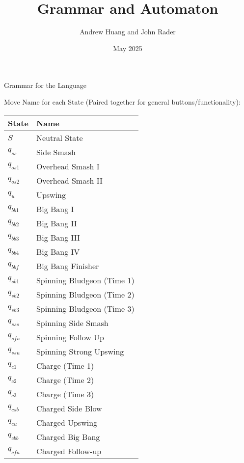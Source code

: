 \documentclass{article}
\title{Grammar and Automaton}
\author{Andrew Huang and John Rader}
\date{May 2025}
\begin{document}
\maketitle


\begin{mylist}

\item Grammar for the Language

Move Name for each State (Paired together for general buttons/functionality): \\
\begin{table}[h] 
  \begin{tabular}{l | l}
    State & Name  \\
    \hline
    $S$ & Neutral State \\
    $q_{ss}$ & Side Smash \\
    $q_{os1}$ & Overhead Smash I \\
    $q_{os2}$ & Overhead Smash II \\
    $q_{u}$ & Upswing \\
    $q_{bb1}$ & Big Bang I \\
    $q_{bb2}$ & Big Bang II \\
    $q_{bb3}$ & Big Bang III \\
    $q_{bb4}$ & Big Bang IV \\
    $q_{bbf}$ & Big Bang Finisher\\
    $q_{sb1}$ & Spinning Bludgeon (Time 1)\\
    $q_{sb2}$ & Spinning Bludgeon (Time 2)\\
    $q_{sb3}$ & Spinning Bludgeon (Time 3)\\
    $q_{sss}$ & Spinning Side Smash\\
    $q_{sfu}$ & Spinning Follow Up\\
    $q_{ssu}$ & Spinning Strong Upswing\\
    $q_{c1}$ & Charge (Time 1)\\
    $q_{c2}$ & Charge (Time 2)\\
    $q_{c3}$ & Charge (Time 3)\\
    $q_{csb}$ & Charged Side Blow\\
    $q_{cu}$ & Charged Upswing\\
    $q_{cbb}$ & Charged Big Bang\\
    $q_{cfu}$ & Charged Follow-up\\

\end{tabular}
\end{table}
\end{mylist}
\end{document}

